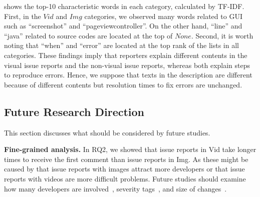  shows the top-10 characteristic words in each category, calculated by TF-IDF.
First, in the $Vid$ and $Img$ categories, we observed many words related to GUI such as ``screenshot'' and ``pageviewcontroller''. 
On the other hand, ``line'' and ``java'' related to source codes are located at the top of $None$.
Second, it is worth noting that ``when'' and ``error'' are located at the top rank of the lists in all categories.
These findings imply that reporters explain different contents in the visual issue reports and the non-visual issue reports, whereas both explain steps to reproduce errors. 
Hence, we suppose that texts in the description are different because of different contents but resolution times to fix errors are unchanged. 



\subsection{Future Research Direction}
This section discusses what should be considered by future studies. 

\noindent
\textbf{Fine-grained analysis. }
In RQ2, we showed that issue reports in Vid take longer times to receive the first comment than issue reports in Img. 
As these might be caused by that issue reports with images attract more developers or that issue reports with videos are more difficult problems.
Future studies should examine how many developers are involved~\citep{DBLP:conf/icsm/BavotaR15}, severity tags~\citep{DBLP:conf/issre/ZhouNG15}, and size of changes~\citep{DBLP:conf/kbse/HattoriL08}.

